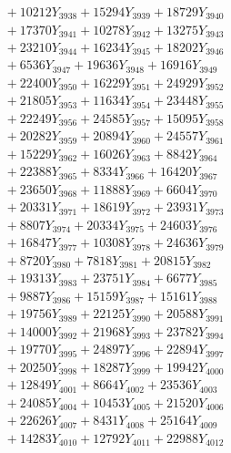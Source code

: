 \documentclass[a4paper,10pt]{article}
\begin{document}
{\begin{align}
&\;  + 10212 Y_{3938} + 15294 Y_{3939} + 18729 Y_{3940} \\[0.3ex]
&\;  + 17370 Y_{3941} + 10278 Y_{3942} + 13275 Y_{3943} \\[0.3ex]
&\;  + 23210 Y_{3944} + 16234 Y_{3945} + 18202 Y_{3946} \\[0.3ex]
&\;  + 6536 Y_{3947} + 19636 Y_{3948} + 16916 Y_{3949} \\[0.3ex]
&\;  + 22400 Y_{3950} + 16229 Y_{3951} + 24929 Y_{3952} \\[0.3ex]
&\;  + 21805 Y_{3953} + 11634 Y_{3954} + 23448 Y_{3955} \\[0.3ex]
&\;  + 22249 Y_{3956} + 24585 Y_{3957} + 15095 Y_{3958} \\[0.5ex]\allowbreak
&\;  + 20282 Y_{3959} + 20894 Y_{3960} + 24557 Y_{3961} \\[0.3ex]
&\;  + 15229 Y_{3962} + 16026 Y_{3963} + 8842 Y_{3964} \\[0.3ex]
&\;  + 22388 Y_{3965} + 8334 Y_{3966} + 16420 Y_{3967} \\[0.3ex]
&\;  + 23650 Y_{3968} + 11888 Y_{3969} + 6604 Y_{3970} \\[0.3ex]
&\;  + 20331 Y_{3971} + 18619 Y_{3972} + 23931 Y_{3973} \\[0.3ex]
&\;  + 8807 Y_{3974} + 20334 Y_{3975} + 24603 Y_{3976} \\[0.3ex]
&\;  + 16847 Y_{3977} + 10308 Y_{3978} + 24636 Y_{3979} \\[0.3ex]
&\;  + 8720 Y_{3980} + 7818 Y_{3981} + 20815 Y_{3982} \\[0.3ex]
&\;  + 19313 Y_{3983} + 23751 Y_{3984} + 6677 Y_{3985} \\[0.3ex]
&\;  + 9887 Y_{3986} + 15159 Y_{3987} + 15161 Y_{3988} \\[0.5ex]\allowbreak
&\;  + 19756 Y_{3989} + 22125 Y_{3990} + 20588 Y_{3991} \\[0.3ex]
&\;  + 14000 Y_{3992} + 21968 Y_{3993} + 23782 Y_{3994} \\[0.3ex]
&\;  + 19770 Y_{3995} + 24897 Y_{3996} + 22894 Y_{3997} \\[0.3ex]
&\;  + 20250 Y_{3998} + 18287 Y_{3999} + 19942 Y_{4000} \\[0.3ex]
&\;  + 12849 Y_{4001} + 8664 Y_{4002} + 23536 Y_{4003} \\[0.3ex]
&\;  + 24085 Y_{4004} + 10453 Y_{4005} + 21520 Y_{4006} \\[0.3ex]
&\;  + 22626 Y_{4007} + 8431 Y_{4008} + 25164 Y_{4009} \\[0.3ex]
&\;  + 14283 Y_{4010} + 12792 Y_{4011} + 22988 Y_{4012} \\[0.3ex]

\end{align}}
\end{document}

